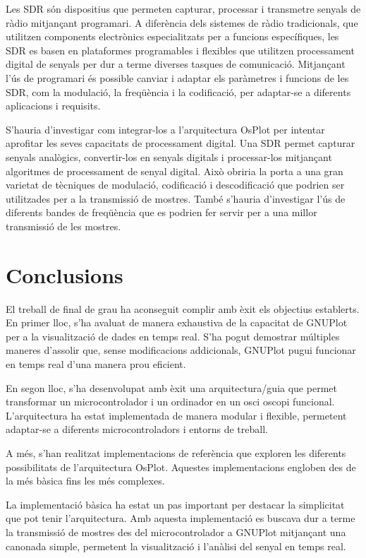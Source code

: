 \documentclass{tfgitic}[2023/06/30]
\begin{document}
Les SDR són dispositius que permeten capturar, processar i transmetre
senyals de ràdio mitjançant programari. A diferència dels sistemes de
ràdio tradicionals, que utilitzen components electrònics
especialitzats per a funcions específiques, les SDR es basen en
plataformes programables i flexibles que utilitzen processament
digital de senyals per dur a terme diverses tasques de comunicació.
Mitjançant l'ús de programari és possible canviar i adaptar els
paràmetres i funcions de les SDR, com la modulació, la freqüència i la
codificació, per adaptar-se a diferents aplicacions i requisits.

S'hauria d'investigar com integrar-los a l'arquitectura OsPlot per
intentar aprofitar les seves capacitats de processament digital. Una
SDR permet capturar senyals analògics, convertir-los en senyals
digitals i processar-los mitjançant algoritmes de processament de
senyal digital. Això obriria la porta a una gran varietat de tècniques
de modulació, codificació i descodificació que podrien ser utilitzades
per a la transmissió de mostres. També s'hauria d'investigar l'ús de
diferents bandes de freqüència que es podrien fer servir per a una
millor transmissió de les mostres.

\chapter{Conclusions}

El treball de final de grau ha aconseguit complir amb èxit els
objectius establerts. En primer lloc, s'ha avaluat de manera
exhaustiva de la capacitat de GNUPlot per a la visualització de dades
en temps real. S'ha pogut demostrar múltiples maneres d'assolir que,
sense modificacions addicionals, GNUPlot pugui funcionar en temps real
d'una manera prou eficient.

En segon lloc, s'ha desenvolupat amb èxit una arquitectura/guia que
permet transformar un microcontrolador i un ordinador en un osci\lgem
oscopi funcional. L'arquitectura ha estat implementada de manera
modular i flexible, permetent adaptar-se a diferents microcontroladors
i entorns de treball.

A més, s'han realitzat implementacions de referència que exploren les
diferents possibilitats de l'arquitectura OsPlot. Aquestes
implementacions engloben des de la més bàsica fins les més complexes.

La implementació bàsica ha estat un pas important per destacar la
simplicitat que pot tenir l'arquitectura. Amb aquesta implementació es
buscava dur a terme la transmissió de mostres des del microcontrolador
a GNUPlot mitjançant una canonada simple, permetent la visualització i
l'anàlisi del senyal en temps real.
\end{document}
